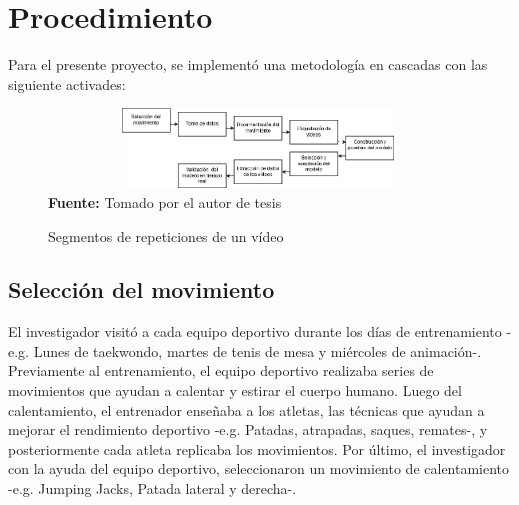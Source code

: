 \section{Procedimiento}
Para el presente proyecto, se implement\'o una metodolog\'ia en cascadas con las siguiente activades:
\begin{figure}[H]
	\caption{Segmentos de repeticiones de un v\'ideo}
	\label{fig:segVideo}
	\centering
	\includegraphics[width=420px,height=80px]{graphics/cascada.PNG} \\
	\textbf{Fuente:} Tomado por el autor de tesis
\end{figure} 
\subsection{Selecci\'on del movimiento}
El investigador visit\'o a cada equipo deportivo durante los d\'ias de entrenamiento -e.g. Lunes de taekwondo, martes de tenis de mesa y mi\'ercoles de animaci\'on-.  Previamente al entrenamiento, el equipo deportivo realizaba series de movimientos que ayudan a calentar y estirar el cuerpo humano.  Luego del calentamiento, el entrenador ense\~naba a los atletas, las t\'ecnicas que ayudan a mejorar el rendimiento deportivo -e.g. Patadas, atrapadas, saques, remates-, y posteriormente cada atleta replicaba los movimientos. Por \'ultimo, el investigador con la ayuda del equipo deportivo, seleccionaron un movimiento de calentamiento -e.g. Jumping Jacks, Patada lateral y derecha-.
